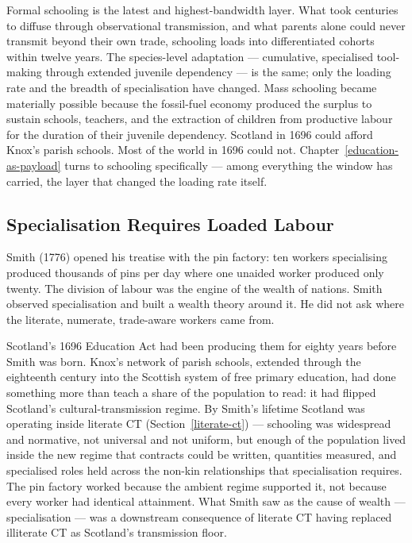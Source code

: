 \documentclass[12pt,letterpaper]{article}
\begin{document}
Formal schooling is the latest and highest-bandwidth layer. What took
centuries to diffuse through observational transmission, and what
parents alone could never transmit beyond their own trade, schooling
loads into differentiated cohorts within twelve years. The
species-level adaptation --- cumulative, specialised tool-making
through extended juvenile dependency --- is the same; only the
loading rate and the breadth of specialisation have changed. Mass
schooling became materially possible because the fossil-fuel economy
produced the surplus to sustain schools, teachers, and the extraction
of children from productive labour for the duration of their
juvenile dependency. Scotland in 1696 could afford Knox's parish
schools. Most of the world in 1696 could not. Chapter~\ref{education-as-payload}
turns to schooling specifically --- among everything the window has
carried, the layer that changed the loading rate itself.

\subsection{Specialisation Requires Loaded Labour}\label{specialisation-requires-loaded-labour}

Smith (1776) opened his treatise with the pin factory: ten workers
specialising produced thousands of pins per day where one unaided
worker produced only twenty. The division of labour was the engine of
the wealth of nations. Smith observed specialisation and built a
wealth theory around it. He did not ask where the literate, numerate,
trade-aware workers came from.

Scotland's 1696 Education Act had been producing them for eighty
years before Smith was born. Knox's network of parish schools,
extended through the eighteenth century into the Scottish system of
free primary education, had done something more than teach a share of
the population to read: it had flipped Scotland's cultural-transmission
regime. By Smith's lifetime Scotland was operating inside literate CT
(Section~\ref{literate-ct}) --- schooling was widespread and
normative, not universal and not uniform, but enough of the population
lived inside the new regime that contracts could be written,
quantities measured, and specialised roles held across the non-kin
relationships that specialisation requires. The pin factory worked
because the ambient regime supported it, not because every worker had
identical attainment. What Smith saw as the cause of wealth ---
specialisation --- was a downstream consequence of literate CT having
replaced illiterate CT as Scotland's transmission floor.
\end{document}
